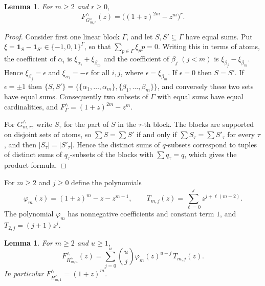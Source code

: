 \documentclass[11pt]{amsart}
\newtheorem{lemma}[theorem]{Lemma}
\theoremstyle{definition}
\theoremstyle{remark}
\numberwithin{equation}{section}
\newcommand{\Fr}{F^{\wedge}}
\begin{document}
\begin{lemma}\label{lem:rG}
For $m\ge 2$ and $r\ge 0$,
\[
\Fr_{G^\wedge_{m,r}}(z)=\bigl((1+z)^{2m}-z^m\bigr)^r .
\]
\end{lemma}

\begin{proof}
Consider first one linear block $\Gamma$, and let $S,S'\subseteq\Gamma$ have equal sums. Put $\xi=\mathbf 1_S-\mathbf 1_{S'}\in\{-1,0,1\}^\Gamma$, so that $\sum_{p\in\Gamma}\xi_pp=0$. Writing this in terms of atoms, the coefficient of $\alpha_i$ is $\xi_{\alpha_i}+\xi_{\beta_m}$ and the coefficient of $\beta_j$ $(j<m)$ is $\xi_{\beta_j}-\xi_{\beta_m}$. Hence $\xi_{\beta_j}=\epsilon$ and $\xi_{\alpha_i}=-\epsilon$ for all $i,j$, where $\epsilon=\xi_{\beta_m}$. If $\epsilon=0$ then $S=S'$. If $\epsilon=\pm1$ then $\{S,S'\}=\{\{\alpha_1,\dots,\alpha_m\},\{\beta_1,\dots,\beta_m\}\}$, and conversely these two sets have equal sums. Consequently two subsets of $\Gamma$ with equal sums have equal cardinalities, and $\Fr_\Gamma=(1+z)^{2m}-z^m$.

For $G^\wedge_{m,r}$, write $S_\tau$ for the part of $S$ in the $\tau$-th block. The blocks are supported on disjoint sets of atoms, so $\sum S=\sum S'$ if and only if $\sum S_\tau=\sum S'_\tau$ for every $\tau$, and then $|S_\tau|=|S'_\tau|$. Hence the distinct sums of $q$-subsets correspond to tuples of distinct sums of $q_\tau$-subsets of the blocks with $\sum q_\tau=q$, which gives the product formula.
\end{proof}

For $m\ge 2$ and $j\ge 0$ define the polynomials
\[
\varphi_m(z)=(1+z)^m-z-z^{m-1},\qquad T_{m,j}(z)=\sum_{\ell=0}^jz^{j+\ell(m-2)}.
\]
The polynomial $\varphi_m$ has nonnegative coefficients and constant term $1$, and $T_{2,j}=(j+1)z^j$.

\begin{lemma}\label{lem:rH}
For $m\ge 2$ and $u\ge 1$,
\[
\Fr_{H^\wedge_{m,u}}(z)=\sum_{j=0}^u\binom uj\varphi_m(z)^{u-j}\,T_{m,j}(z).
\]
In particular $\Fr_{H^\wedge_{m,1}}=(1+z)^m$.
\end{lemma}
\end{document}
